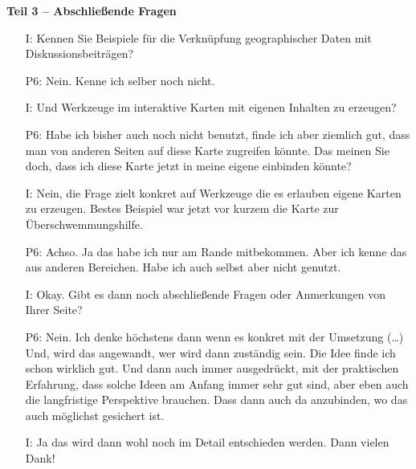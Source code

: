 \textbf{Teil 3 -- Abschlie{\ss}ende Fragen}
\begin{itemize}
    \item[I:] Kennen Sie Beispiele f{\"u}r die Verkn{\"u}pfung geographischer Daten mit Diskussionsbeitr{\"a}gen?
    \item[P6:] Nein. Kenne ich selber noch nicht.
    \item[I:] Und Werkzeuge im interaktive Karten mit eigenen Inhalten zu erzeugen?
    \item[P6:] Habe ich bisher auch noch nicht benutzt, finde ich aber ziemlich gut, dass man von anderen Seiten auf diese Karte zugreifen k{\"o}nnte. Das meinen Sie doch, dass ich diese Karte jetzt in meine eigene einbinden k{\"o}nnte?
    \item[I:] Nein, die Frage zielt konkret auf Werkzeuge die es erlauben eigene Karten zu erzeugen. Bestes Beispiel war jetzt vor kurzem die Karte zur {\"U}berschwemmungshilfe.
    \item[P6:] Achso. Ja das habe ich nur am Rande mitbekommen. Aber ich kenne das aus anderen Bereichen. Habe ich auch selbst aber nicht genutzt.
    \item[I:] Okay. Gibt es dann noch abschlie{\ss}ende Fragen oder Anmerkungen von Ihrer Seite?
    \item[P6:] Nein. Ich denke h{\"o}chstens dann wenn es konkret mit der Umsetzung (\dots) Und, wird das angewandt, wer wird dann zust{\"a}ndig sein. Die Idee finde ich schon wirklich gut. Und dann auch immer ausgedr{\"u}ckt, mit der praktischen Erfahrung, dass solche Ideen am Anfang immer sehr gut sind, aber eben auch die langfristige Perspektive brauchen. Dass dann auch da anzubinden, wo das auch m{\"o}glichst gesichert ist.
    \item[I:] Ja das wird dann wohl noch im Detail entschieden werden. Dann vielen Dank!
\end{itemize}